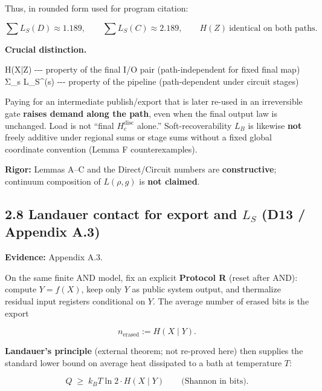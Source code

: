 \documentclass[
  11pt,
]{article}
\newenvironment{Shaded}{}{}
\newcommand{\NormalTok}[1]{#1}
\begin{document}
Thus, in rounded form used for program citation:

\[
\sum L_S(D)\approx 1.189,\qquad
\sum L_S(C)\approx 2.189,\qquad
H(Z)\ \text{identical on both paths}.
\]

\textbf{Crucial distinction.}

\begin{Shaded}
\begin{Highlighting}[]
\NormalTok{H(X|Z)           {-}{-}{-} property of the final I/O pair (path{-}independent for fixed final map)}
\NormalTok{Σ\_s L\_S\^{}(s)      {-}{-}{-} property of the pipeline (path{-}dependent under circuit stages)}
\end{Highlighting}
\end{Shaded}

Paying for an intermediate publish/export that is later re-used in an
irreversible gate \textbf{raises demand along the path}, even when the
final output law is unchanged. Load is not ``final
\(H_c^{\mathrm{disc}}\) alone.'' Soft-recoverability \(L_B\) is likewise
\textbf{not} freely additive under regional sums or stage sums without a
fixed global coordinate convention (Lemma F counterexamples).

\textbf{Rigor:} Lemmas A--C and the Direct/Circuit numbers are
\textbf{constructive}; continuum composition of \(L(\rho,g)\) is
\textbf{not claimed}.

\subsection{\texorpdfstring{2.8 Landauer contact for export and \(L_S\)
(D13 / Appendix
A.3)}{2.8 Landauer contact for export and L\_S (D13 / Appendix A.3)}}\label{landauer-contact-for-export-and-l_s-d13-appendix-a.3}

\textbf{Evidence:} Appendix A.3.

On the same finite AND model, fix an explicit \textbf{Protocol R} (reset
after AND): compute \(Y=f(X)\), keep only \(Y\) as public system output,
and thermalize residual input registers conditional on \(Y\). The
average number of erased bits is the export

\[
n_{\mathrm{erased}} := H(X\mid Y).
\]

\textbf{Landauer's principle} (external theorem; not re-proved here)
then supplies the standard lower bound on average heat dissipated to a
bath at temperature \(T\):

\[
Q \;\ge\; k_B T \ln 2 \cdot H(X\mid Y)
\qquad\text{(Shannon in bits)}.
\]
\end{document}
